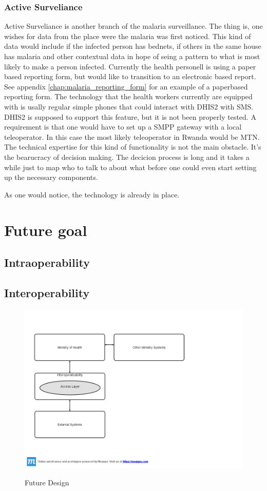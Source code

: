 \subsubsection{Active Surveliance}
Active Surveliance is another branch of the malaria surveillance. The thing is, one wishes for data from the place were the malaria was first noticed.
This kind of data would include if the infected person has bednets, if others in the same house has malaria and other contextual data in hope of seing a pattern to what is most likely to make a person infected. 
Currently the health personell is using a paper based reporting form, but would like to transition to an electronic based report. See appendix \ref{chap:malaria_reporting_form} for an example of a paperbased reporting form.
The technology that the health workers currently are equipped with is usally regular simple phones that could interact with DHIS2 with SMS. 
DHIS2 is supposed to support this feature, but it is not been properly tested. 
A requirement is that one would have to set up a SMPP gateway with a local teleoperator. In this case the most likely teleoperator in Rwanda would be MTN.
The technical expertise for this kind of functionality is not the main obstacle. It's the bearucracy of decision making. 
The decicion process is long and it takes a while just to map who to talk to about what before one could even start setting up the necessary components.

As one would notice, the technology is already in place.




\section{Future goal}

\subsection{Intraoperability}
 
\subsection{Interoperability}
\begin{figure}
\centering
\includegraphics[width=12cm]{empirical/images/future_design_rwanda}
\label{future_design}
\caption{Future Design}
\end{figure}
